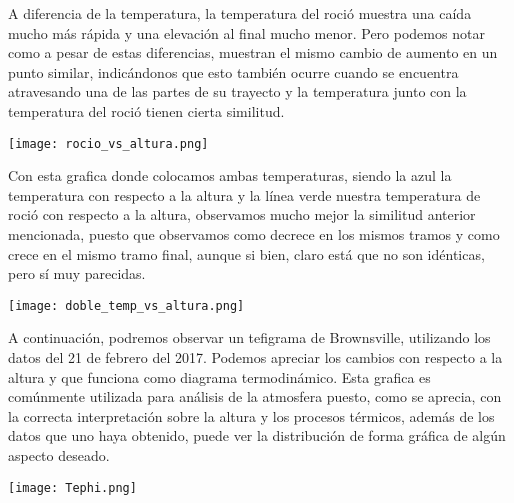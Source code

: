 \documentclass[a4paper,12pt]{article}
\begin{document}
\noindent
A diferencia de la temperatura, la temperatura del roció muestra una caída mucho más rápida y una elevación al final mucho menor. Pero podemos notar como a pesar de estas diferencias, muestran el mismo cambio de aumento en un punto similar, indicándonos que esto también ocurre cuando se encuentra atravesando una de las partes de su trayecto y la temperatura junto con la temperatura del roció tienen cierta similitud.
\begin{center}
\texttt{[image: rocio\_vs\_altura.png]}
\end{center}

\noindent
Con esta grafica donde colocamos ambas temperaturas, siendo la azul la temperatura con respecto a la altura y la línea verde nuestra temperatura de roció con respecto a la altura, observamos mucho mejor la similitud anterior mencionada, puesto que observamos como decrece en los mismos tramos y como crece en el mismo tramo final, aunque si bien, claro está que no son idénticas, pero sí muy parecidas.
\begin{center}
\texttt{[image: doble\_temp\_vs\_altura.png]}
\end{center}

\newpage
\noindent
A continuación, podremos observar un tefigrama de Brownsville, utilizando los datos del 21 de febrero del 2017. Podemos apreciar los cambios con respecto a la altura y que funciona como diagrama termodinámico. Esta grafica es comúnmente utilizada para análisis de la atmosfera puesto, como se aprecia, con la correcta interpretación sobre la altura y los procesos térmicos, además de los datos que uno haya obtenido, puede ver la distribución de forma gráfica de algún aspecto deseado.
\begin{center}
\texttt{[image: Tephi.png]}
\end{center}
\end{document}
